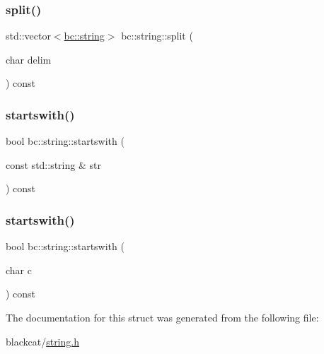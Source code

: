 \mbox{\label{structbc_1_1string_ac4240df9fd8d9b4a082f85910e6af7cd}} 
\subsubsection{\texorpdfstring{split()}{split()}}
{\footnotesize\ttfamily std\+::vector$<$\hyperlink{structbc_1_1string}{bc\+::string}$>$ bc\+::string\+::split (\begin{DoxyParamCaption}\item[{char}]{delim }\end{DoxyParamCaption}) const\hspace{0.3cm}{\ttfamily [inline]}}

\mbox{\label{structbc_1_1string_a4369807153dd45ee85ff11c384e3e573}} 
\subsubsection{\texorpdfstring{startswith()}{startswith()}\hspace{0.1cm}{\footnotesize\ttfamily [1/2]}}
{\footnotesize\ttfamily bool bc\+::string\+::startswith (\begin{DoxyParamCaption}\item[{const std\+::string \&}]{str }\end{DoxyParamCaption}) const\hspace{0.3cm}{\ttfamily [inline]}}

\mbox{\label{structbc_1_1string_a6e70c02a3a308ceac1da6506bc4680f2}} 
\subsubsection{\texorpdfstring{startswith()}{startswith()}\hspace{0.1cm}{\footnotesize\ttfamily [2/2]}}
{\footnotesize\ttfamily bool bc\+::string\+::startswith (\begin{DoxyParamCaption}\item[{char}]{c }\end{DoxyParamCaption}) const\hspace{0.3cm}{\ttfamily [inline]}}



The documentation for this struct was generated from the following file\+:\begin{DoxyCompactItemize}
\item 
blackcat/\hyperlink{string_8h}{string.\+h}\end{DoxyCompactItemize}
